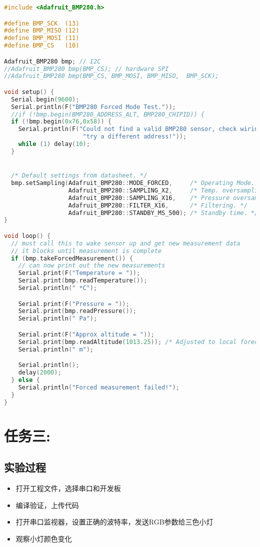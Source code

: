 \documentclass[12pt,hyperref,a4paper,UTF8]{ctexart}
\begin{document}
\begin{lstlisting}[language=C]
#include <Adafruit_BMP280.h>

#define BMP_SCK  (13)
#define BMP_MISO (12)
#define BMP_MOSI (11)
#define BMP_CS   (10)

Adafruit_BMP280 bmp; // I2C
//Adafruit_BMP280 bmp(BMP_CS); // hardware SPI
//Adafruit_BMP280 bmp(BMP_CS, BMP_MOSI, BMP_MISO,  BMP_SCK);

void setup() {
  Serial.begin(9600);
  Serial.println(F("BMP280 Forced Mode Test."));
  //if (!bmp.begin(BMP280_ADDRESS_ALT, BMP280_CHIPID)) {
  if (!bmp.begin(0x76,0x58)) {
    Serial.println(F("Could not find a valid BMP280 sensor, check wiring or "
                      "try a different address!"));
    while (1) delay(10);
  }


  /* Default settings from datasheet. */
  bmp.setSampling(Adafruit_BMP280::MODE_FORCED,     /* Operating Mode. */
                  Adafruit_BMP280::SAMPLING_X2,     /* Temp. oversampling */
                  Adafruit_BMP280::SAMPLING_X16,    /* Pressure oversampling */
                  Adafruit_BMP280::FILTER_X16,      /* Filtering. */
                  Adafruit_BMP280::STANDBY_MS_500); /* Standby time. */
}

void loop() {
  // must call this to wake sensor up and get new measurement data
  // it blocks until measurement is complete
  if (bmp.takeForcedMeasurement()) {
    // can now print out the new measurements
    Serial.print(F("Temperature = "));
    Serial.print(bmp.readTemperature());
    Serial.println(" *C");

    Serial.print(F("Pressure = "));
    Serial.print(bmp.readPressure());
    Serial.println(" Pa");

    Serial.print(F("Approx altitude = "));
    Serial.print(bmp.readAltitude(1013.25)); /* Adjusted to local forecast! */
    Serial.println(" m");

    Serial.println();
    delay(2000);
  } else {
    Serial.println("Forced measurement failed!");
  }
}
\end{lstlisting}



\section{任务三:}
\subsection{实验过程}
\begin{itemize}[itemsep=-5pt, topsep=0pt, partopsep=0pt]
    \item 打开工程文件，选择串口和开发板
    \item 编译验证，上传代码
    \item 打开串口监视器，设置正确的波特率，发送RGB参数给三色小灯
    \item 观察小灯颜色变化
\end{itemize}
\end{document}

